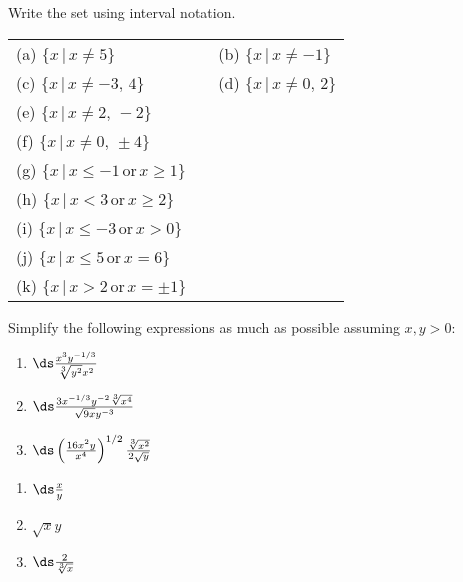 \begin{enumialphparenastyle}

\begin{multicols}{2}

\begin{ex}
Write the set using interval notation.
\begin{tabular}{lll}
(a) \hspace{2mm} 	$\{x\,|\, x \neq 5 \}$ 
&& (b) \hspace{2mm} 	$\{x\,|\, x \neq -1 \}$ \\
(c) \hspace{2mm}   $\{x\,|\, x \neq -3,\, 4 \}$
& & (d) \hspace{2mm}	$\{x\,|\, x \neq 0, \, 2 \}$ \\
(e) \hspace{2mm} $\{x\,|\, x \neq 2, \, -2 \}$
& & \\
(f) \hspace{2mm}  $\{x\,|\, x \neq 0,\, \pm 4 \}$ && \\
 (g) \hspace{2mm} $\{x\,|\, x \leq -1 \, \text{or} \, x \geq 1 \}$ &&\\
  (h) \hspace{2mm} 	$\{x\,|\, x < 3 \, \text{or} \, x \geq 2 \}$  && \\
(i) \hspace{2mm} $\{x\,|\, x \leq -3 \, \text{or} \, x > 0 \}$ && \\
 (j) \hspace{2mm}  $\{x\,|\, x \leq 5 \, \text{or} \, x = 6 \}$ && \\
(k) \hspace{2mm} $\{x\,|\, x > 2 \, \text{or} \, x = \pm 1 \}$ &&\\
\end{tabular}
\begin{sol}
\end{sol}
\end{ex}



\begin{ex}
Simplify the following expressions as much as possible assuming $x,y>0$:
\begin{enumerate}
	\item	$\ds\frac{x^3y^{-1/3}}{\sqrt[3]{y^2}x^2}$
	\item	$\ds\frac{3x^{-1/3}y^{-2}\sqrt[3]{x^4}}{\sqrt{9x}y^{-3}}$
	\item	$\ds\left(\frac{16x^2y}{x^4}\right)^{1/2}\frac{\sqrt[3]{x^2}}{2\sqrt{y}}$
\end{enumerate}
\begin{sol}
\begin{enumerate}
	\item	$\ds\frac{x}{y}$
	\item	$\sqrt{x}y$
	\item	$\ds\frac{2}{\sqrt[3]{x}}$
\end{enumerate}
\end{sol}
\end{ex}


\end{multicols}
\end{enumialphparenastyle}
